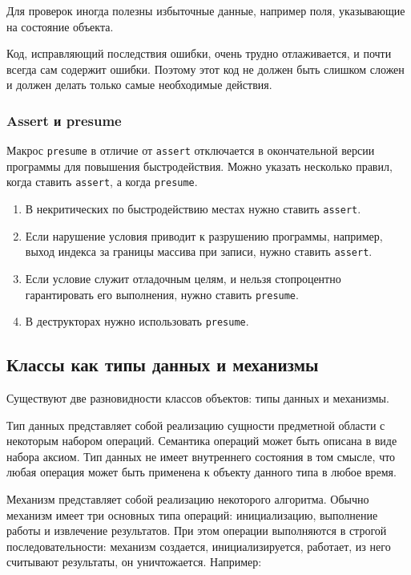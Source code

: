 Для проверок иногда полезны избыточные данные, например поля, указывающие на состояние объекта.

Код, исправляющий последствия ошибки, очень трудно отлаживается, и почти всегда сам содержит ошибки. Поэтому этот код не должен быть слишком сложен и должен делать только самые необходимые действия.

\subsubsection{Assert и presume}

Макрос \lstinline|presume| в отличие от \lstinline|assert| отключается в окончательной версии программы для повышения быстродействия. Можно указать несколько правил, когда ставить \lstinline|assert|, а когда \lstinline|presume|.

\begin{enumerate}
\item В некритических по быстродействию местах нужно ставить \lstinline|assert|.
\item Если нарушение условия приводит к разрушению программы, например, выход индекса за границы массива при записи, нужно ставить \lstinline|assert|.
\item Если условие служит отладочным целям, и нельзя стопроцентно гарантировать его выполнения, нужно ставить \lstinline|presume|.
\item В деструкторах нужно использовать \lstinline|presume|.
\end{enumerate}

\newpage
\subsection{Классы как типы данных и механизмы}

Существуют две разновидности классов объектов: типы данных и механизмы.

Тип данных представляет собой реализацию сущности предметной области с некоторым набором операций. Семантика операций может быть описана в виде набора аксиом. Тип данных не имеет внутреннего состояния в том смысле, что любая операция может быть применена к объекту данного типа в любое время.

Механизм представляет собой реализацию некоторого алгоритма. Обычно механизм имеет три основных типа операций: инициализацию, выполнение работы и извлечение результатов. При этом операции выполняются в строгой последовательности: механизм создается, инициализируется, работает, из него считывают результаты, он уничтожается. Например:

